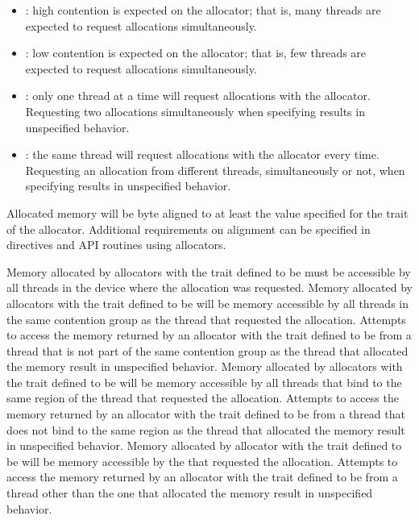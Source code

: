 \begin{itemize}
\item {}: high contention is expected on the allocator; that 
      is, many threads are expected to request allocations simultaneously.
\item {}: low contention is expected on the allocator; that 
      is, few threads are expected to request allocations simultaneously.
\item {}: only one thread at a time will request allocations 
      with the allocator. Requesting two allocations simultaneously when 
      specifying  results in unspecified behavior.
\item {}: the same thread will request allocations with the 
      allocator every time. Requesting an allocation from different threads, 
      simultaneously or not, when specifying  results in 
      unspecified behavior.
\end{itemize}

Allocated memory will be byte aligned to at least the value specified for the 
{} trait of the allocator. Additional requirements on alignment
can be specified in directives and API routines using allocators.

Memory allocated by allocators with the  trait defined to be 
 must be accessible by all threads in the device where the allocation 
was requested. Memory allocated by allocators with the  trait 
defined to be  will be memory accessible by all threads in the 
same contention group as the thread that requested the allocation. Attempts to 
access the memory returned by an allocator with the  trait 
defined to be  from a thread that is not part of the same 
contention group as the thread that allocated the memory result in unspecified 
behavior. Memory allocated by allocators with the  trait defined 
to be  will be memory accessible by all threads that bind to the 
same {} region of the thread that requested the allocation. Attempts 
to access the memory returned by  an allocator with the  trait 
defined to be  from a thread that does not bind to the same 
{} region as the thread that allocated the memory result 
in unspecified behavior. Memory allocated by allocator with the  
trait defined to be  will be memory accessible by the {} 
that requested the allocation. Attempts to access the memory returned by an allocator 
with the  trait defined to be  from a thread other 
than the one that allocated the memory result in unspecified behavior.

